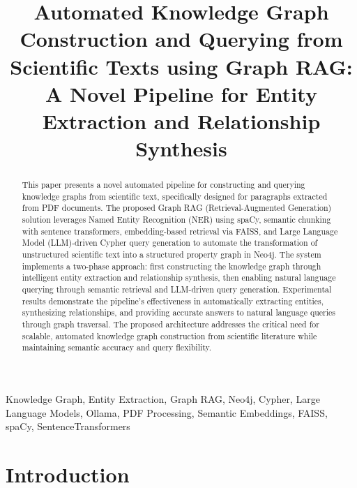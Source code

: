 \documentclass[conference]{IEEEtran}
\begin{document}
\title{Automated Knowledge Graph Construction and Querying from Scientific Texts using Graph RAG: A Novel Pipeline for Entity Extraction and Relationship Synthesis}

\author{
}

\maketitle

\begin{abstract}
This paper presents a novel automated pipeline for constructing and querying knowledge graphs from scientific text, specifically designed for paragraphs extracted from PDF documents. The proposed Graph RAG (Retrieval-Augmented Generation) solution leverages Named Entity Recognition (NER) using spaCy, semantic chunking with sentence transformers, embedding-based retrieval via FAISS, and Large Language Model (LLM)-driven Cypher query generation to automate the transformation of unstructured scientific text into a structured property graph in Neo4j. The system implements a two-phase approach: first constructing the knowledge graph through intelligent entity extraction and relationship synthesis, then enabling natural language querying through semantic retrieval and LLM-driven query generation. Experimental results demonstrate the pipeline's effectiveness in automatically extracting entities, synthesizing relationships, and providing accurate answers to natural language queries through graph traversal. The proposed architecture addresses the critical need for scalable, automated knowledge graph construction from scientific literature while maintaining semantic accuracy and query flexibility.
\end{abstract}

\begin{IEEEkeywords}
Knowledge Graph, Entity Extraction, Graph RAG, Neo4j, Cypher, Large Language Models, Ollama, PDF Processing, Semantic Embeddings, FAISS, spaCy, SentenceTransformers
\end{IEEEkeywords}

\section{Introduction}
\end{document}
